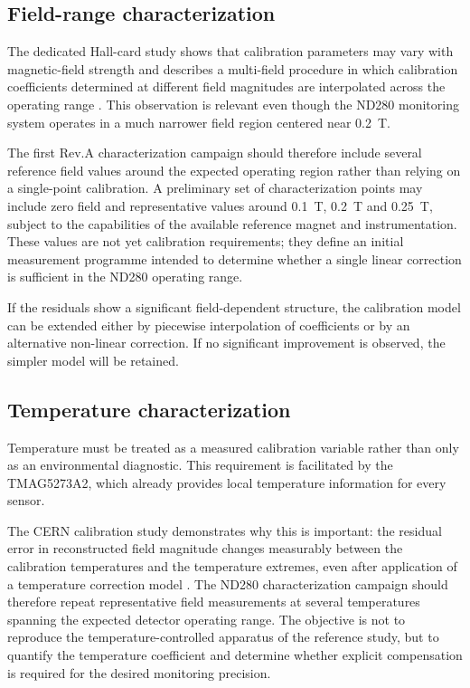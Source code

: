 \subsection{Field-range characterization}

The dedicated Hall-card study shows that calibration parameters may vary with magnetic-field strength and describes a multi-field procedure in which calibration coefficients determined at different field magnitudes are interpolated across the operating range \cite{MessnerHallCalibration}. This observation is relevant even though the ND280 monitoring system operates in a much narrower field region centered near \SI{0.2}{T}.

The first Rev.A characterization campaign should therefore include several reference field values around the expected operating region rather than relying on a single-point calibration. A preliminary set of characterization points may include zero field and representative values around \SI{0.1}{T}, \SI{0.2}{T} and \SI{0.25}{T}, subject to the capabilities of the available reference magnet and instrumentation. These values are not yet calibration requirements; they define an initial measurement programme intended to determine whether a single linear correction is sufficient in the ND280 operating range.

If the residuals show a significant field-dependent structure, the calibration model can be extended either by piecewise interpolation of coefficients or by an alternative non-linear correction. If no significant improvement is observed, the simpler model will be retained.

\subsection{Temperature characterization}

Temperature must be treated as a measured calibration variable rather than only as an environmental diagnostic. This requirement is facilitated by the TMAG5273A2, which already provides local temperature information for every sensor.

The CERN calibration study demonstrates why this is important: the residual error in reconstructed field magnitude changes measurably between the calibration temperatures and the temperature extremes, even after application of a temperature correction model \cite{MessnerHallCalibration}. The ND280 characterization campaign should therefore repeat representative field measurements at several temperatures spanning the expected detector operating range. The objective is not to reproduce the temperature-controlled apparatus of the reference study, but to quantify the temperature coefficient and determine whether explicit compensation is required for the desired monitoring precision.

